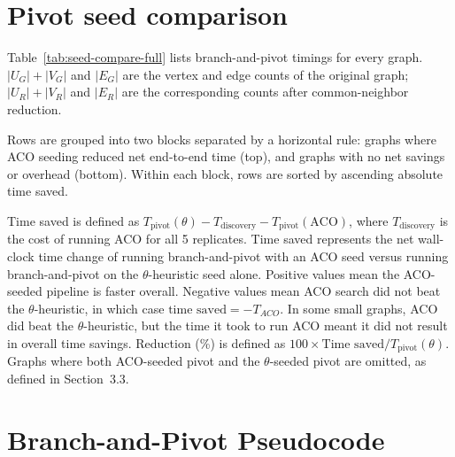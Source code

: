 \documentclass[conference]{IEEEtran}
\begin{document}

\section{Pivot seed comparison}

Table~\ref{tab:seed-compare-full} lists branch-and-pivot timings for every graph. $|U_G|+|V_G|$ and $|E_G|$ are the vertex and edge counts of the original graph; $|U_R|+|V_R|$ and $|E_R|$ are the corresponding counts after common-neighbor reduction.

Rows are grouped into two blocks separated by a horizontal rule: graphs where ACO seeding reduced net end-to-end time (top), and graphs with no net savings or overhead (bottom). Within each block, rows are sorted by ascending absolute time saved.

Time saved is defined as $T_{\mathrm{pivot}}(\theta) - T_{\mathrm{discovery}} - T_{\mathrm{pivot}}(\mathrm{ACO})$, where $T_{\mathrm{discovery}}$ is the cost of running ACO for all 5 replicates. Time saved represents the net wall-clock time change of running branch-and-pivot with an ACO seed versus running branch-and-pivot on the $\theta$-heuristic seed alone. Positive values mean the ACO-seeded pipeline is faster overall. Negative values mean ACO search did not beat the $\theta$-heuristic, in which case $\text{time saved} = -T_{ACO}$. In some small graphs, ACO did beat the $\theta$-heuristic, but the time it took to run ACO meant it did not result in overall time savings. Reduction (\%) is defined as $100 \times \text{Time saved} / T_{\mathrm{pivot}}(\theta)$. Graphs where both ACO-seeded pivot and the $\theta$-seeded pivot are omitted, as defined in Section~3.3.


\section{Branch-and-Pivot Pseudocode}
\end{document}
